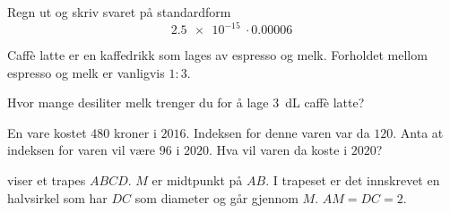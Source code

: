 
\Oppgave[1] %

Regn ut og skriv svaret på standardform
%
\begin{equation*}
  \SI{2.5e-15}{}
  \cdot
  \SI{0.00006}{}
\end{equation*}


\Oppgave[2] %

Caffè latte er en kaffedrikk som lages av espresso og melk.
Forholdet mellom espresso og melk er vanligvis $1\colon3$. \medskip

Hvor mange desiliter melk trenger du for å lage \SI{3}{\deci\liter} caffè latte?


\Oppgave[2] %

En vare kostet $480$ kroner i $2016$. Indeksen for denne varen var da $120$.
Anta at indeksen for varen vil være $96$ i $2020$.
Hva vil varen da koste i $2020$?


\Oppgave[4] %

 viser et trapes $ABCD$. $M$ er midtpunkt på $AB$. I
trapeset er det innskrevet en halvsirkel som har $DC$ som diameter og går
gjennom $M$. $AM = DC = 2$.

\begin{figure}[H]
  \caption{}
  \label{fig:Del-1-Oppgave-5-1}
\end{figure}


